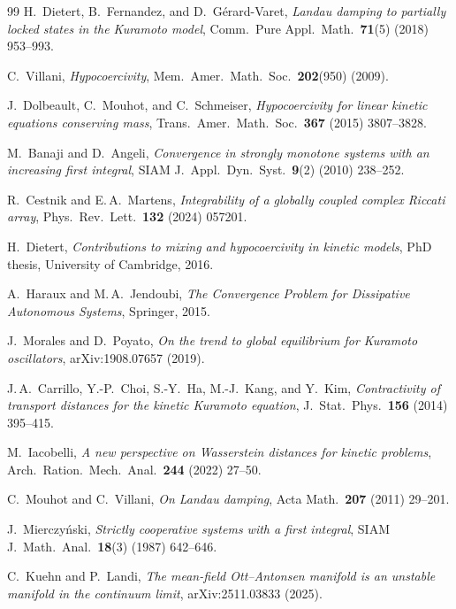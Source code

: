 \documentclass[11pt,a4paper]{article}
\theoremstyle{definition}
\begin{document}
\begin{thebibliography}{99}
H.~Dietert, B.~Fernandez, and D.~G\'erard-Varet, \emph{Landau damping to partially locked states in the Kuramoto model}, Comm.\ Pure Appl.\ Math.\ \textbf{71}(5) (2018) 953--993.

C.~Villani, \emph{Hypocoercivity}, Mem.\ Amer.\ Math.\ Soc.\ \textbf{202}(950) (2009).

J.~Dolbeault, C.~Mouhot, and C.~Schmeiser, \emph{Hypocoercivity for linear kinetic equations conserving mass}, Trans.\ Amer.\ Math.\ Soc.\ \textbf{367} (2015) 3807--3828.

M.~Banaji and D.~Angeli, \emph{Convergence in strongly monotone systems with an increasing first integral}, SIAM J.\ Appl.\ Dyn.\ Syst.\ \textbf{9}(2) (2010) 238--252.

R.~Cestnik and E.\,A.~Martens, \emph{Integrability of a globally coupled complex Riccati array}, Phys.\ Rev.\ Lett.\ \textbf{132} (2024) 057201.

H.~Dietert, \emph{Contributions to mixing and hypocoercivity in kinetic models}, PhD thesis, University of Cambridge, 2016.

A.~Haraux and M.\,A.~Jendoubi, \emph{The Convergence Problem for Dissipative Autonomous Systems}, Springer, 2015.

J.~Morales and D.~Poyato, \emph{On the trend to global equilibrium for Kuramoto oscillators}, arXiv:1908.07657 (2019).

J.\,A.~Carrillo, Y.-P.~Choi, S.-Y.~Ha, M.-J.~Kang, and Y.~Kim, \emph{Contractivity of transport distances for the kinetic Kuramoto equation}, J.\ Stat.\ Phys.\ \textbf{156} (2014) 395--415.

M.~Iacobelli, \emph{A new perspective on Wasserstein distances for kinetic problems}, Arch.\ Ration.\ Mech.\ Anal.\ \textbf{244} (2022) 27--50.

C.~Mouhot and C.~Villani, \emph{On Landau damping}, Acta Math.\ \textbf{207} (2011) 29--201.

J.~Mierczy\'nski, \emph{Strictly cooperative systems with a first integral}, SIAM J.\ Math.\ Anal.\ \textbf{18}(3) (1987) 642--646.

C.~Kuehn and P.~Landi, \emph{The mean-field Ott--Antonsen manifold is an unstable manifold in the continuum limit}, arXiv:2511.03833 (2025).


\end{thebibliography}
\end{document}
